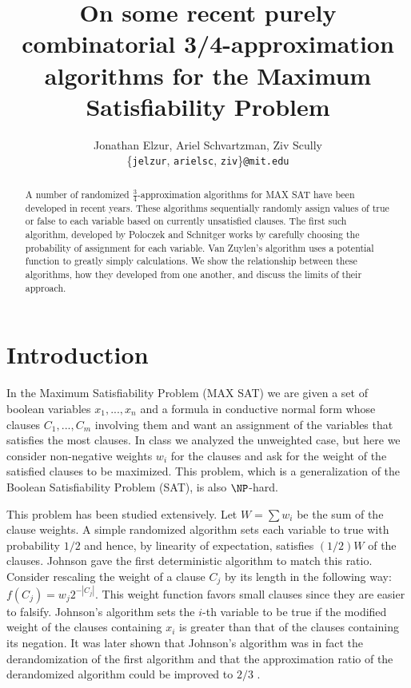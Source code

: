 \documentclass[11pt,letter]{article}
\numberwithin{theorem}{section}
\begin{document}

\title{On some recent purely combinatorial 3/4-approximation algorithms for the Maximum Satisfiability Problem}

\author{Jonathan Elzur, Ariel Schvartzman, Ziv Scully \\
  \{\texttt{jelzur}, \texttt{arielsc}, \texttt{ziv}\}\texttt{@mit.edu}}

\maketitle
\begin{abstract}
A number of randomized $\frac{3}{4}$-approximation algorithms for MAX SAT have been developed in recent years. These algorithms sequentially randomly assign values of true or false to each variable based on currently unsatisfied clauses. The first such algorithm, developed by Poloczek and Schnitger \cite{Poloczek:2011:RVJ:2133036.2133087} works by carefully choosing the probability of assignment for each variable. Van Zuylen's algorithm \cite{vanZuylen:2011:SAM:2238496.2238512} uses a potential function to greatly simply calculations. We show the relationship between these algorithms, how they developed from one another, and discuss the limits of their approach.
\end{abstract}

\section{Introduction}

In the Maximum Satisfiability Problem (MAX SAT) we are given a set of boolean variables $x_1, ..., x_n$
and a formula in conductive normal form whose clauses $C_1,...,C_m$ involving them and 
want an assignment of the variables that satisfies the most clauses.
In class we analyzed the unweighted case, but here we consider non-negative weights $w_i$ for the clauses
and ask for the weight of the satisfied clauses to be maximized. This problem, which is a generalization of the
Boolean Satisfiability Problem (SAT), is also $\NP$-hard.

This problem has been studied extensively. Let $W = \sum w_i$ be the sum of the clause weights.
A simple randomized algorithm sets each variable to true with probability $1/2$ and hence,
by linearity of expectation, satisfies $(1/2)W$ of the clauses. Johnson \cite{Johnson1974256}
gave the first deterministic algorithm to match this ratio. Consider rescaling the weight of a clause $C_j$
by its length in the following way: $f(C_j) = w_j 2^{-|C_j|}$. This weight function favors small clauses
since they are easier to falsify. Johnson's algorithm sets the $i$-th variable to be true
if the modified weight of the clauses containing $x_i$ is greater than that of the clauses containing its negation.
It was later shown that Johnson's algorithm was in fact the derandomization of the first algorithm and that the
approximation ratio of the derandomized algorithm could be improved to $2/3$ \cite{Chen1999622}.
\end{document}
